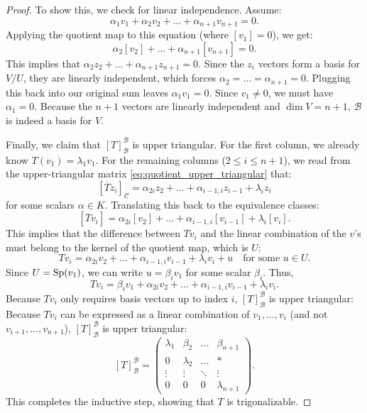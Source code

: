 \begin{proof}
  To show this, we check for linear independence. Assume:
  \[ \alpha_1 v_1 + \alpha_2 v_2 + \dots + \alpha_{n+1} v_{n+1} = 0. \]
  Applying the quotient map to this equation (where $[v_1] = 0$), we get:
  \[ \alpha_2[v_2] + \dots + \alpha_{n+1}[v_{n+1}] = 0. \]
  This implies that $\alpha_2 z_2 + \dots + \alpha_{n+1} z_{n+1} = 0$.
  Since the $z_i$ vectors form a basis for $V/U$, they are linearly independent, which forces $\alpha_2 = \dots = \alpha_{n+1} = 0$.
  Plugging this back into our original sum leaves $\alpha_1 v_1 = 0$. Since $v_1 \ne 0$, we must have $\alpha_1 = 0$.
  Because the $n+1$ vectors are linearly independent and $\dim V = n+1$, $\mathcal{B}$ is indeed a basis for $V$.

  Finally, we claim that $[T]_{\mathcal{B}}^{\mathcal{B}}$ is upper triangular.
  For the first column, we already know $T(v_1) = \lambda_1 v_1$.
  For the remaining columns ($2 \le i \le n+1$), we read from the upper-triangular matrix \eqref{eq:quotient_upper_triangular} that:
  \[ [\overline{T}z_i]_{\mathcal{C}} = \alpha_{2i}z_2 + \dots + \alpha_{i-1, i}z_{i-1} + \lambda_i z_i \]
  for some scalars $\alpha \in K$. Translating this back to the equivalence classes:
  \[ [\overline{T}v_i] = \alpha_{2i}[v_2] + \dots + \alpha_{i-1, i}[v_{i-1}] + \lambda_i [v_i]. \]
  This implies that the difference between $Tv_i$ and the linear combination of the $v$'s must belong to the kernel of the quotient map, which is $U$:
  \[ Tv_i = \alpha_{2i}v_2 + \dots + \alpha_{i-1, i}v_{i-1} + \lambda_i v_i + u \quad \text{for some } u \in U. \]
  Since $U = \operatorname{Sp}(v_1)$, we can write $u = \beta_i v_1$ for some scalar $\beta_i$. Thus,
  \[ Tv_i = \beta_i v_1 + \alpha_{2i}v_2 + \dots + \alpha_{i-1, i}v_{i-1} + \lambda_i v_i. \]
  Because $Tv_i$ only requires basis vectors up to index $i$, $[T]_{\mathcal{B}}^{\mathcal{B}}$ is upper triangular:
  Because $Tv_i$ can be expressed as a linear combination of $v_1, \dots, v_i$ (and not $v_{i+1}, \dots, v_{n+1}$), $[T]_{\mathcal{B}}^{\mathcal{B}}$ is upper triangular:
  \[ [T]_{\mathcal{B}}^{\mathcal{B}} = \begin{pmatrix} \lambda_1 & \beta_2 & \dots & \beta_{n+1} \\ 0 & \lambda_2 & \dots & * \\ \vdots & \vdots & \ddots & \vdots \\ 0 & 0 & 0 & \lambda_{n+1} \end{pmatrix}. \]
  This completes the inductive step, showing that $T$ is trigonalizable.
\end{proof}

